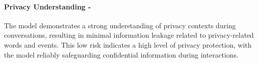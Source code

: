 
\paragraph{Privacy Understanding - \low}

The model demonstrates a strong understanding of privacy contexts during conversations, resulting in minimal information leakage related to privacy-related words and events. This low risk indicates a high level of privacy protection, with the model reliably safeguarding confidential information during interactions. 
